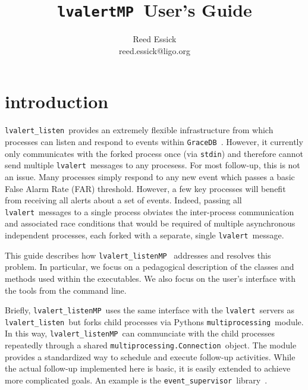 \documentclass{article}
\newcommand{\stdin}{\texttt{stdin}}
\newcommand{\multiprocessing}{\texttt{multiprocessing}}
\newcommand{\multiprocessingConnection}{\texttt{multiprocessing.Connection}}
\newcommand{\GraceDB}{\texttt{GraceDB}}
\newcommand{\alert}{\texttt{lvalert}}
\newcommand{\lvalertListen}{\texttt{lvalert\_listen}}
\newcommand{\lvalertMP}{\texttt{lvalertMP}}
\newcommand{\lvalertListenMP}{\texttt{lvalert\_listenMP}}
\newcommand{\eventSupervisor}{\texttt{event\_supervisor}}
\begin{document}

\title{
\lvalertMP~User's Guide
}

\author{
Reed Essick \\
reed.essick@ligo.org
}

\maketitle

\newpage


\tableofcontents
\listoffigures

\newpage


\section{introduction}

\lvalertListen~provides an extremely flexible infrastructure from which processes can listen and respond to events within \GraceDB~\cite{gracedb}. 
However, it currently only communicates with the forked process once (via \stdin) and therefore cannot send multiple \alert~messages to any procesess.
For most follow-up, this is not an issue.
Many processes simply respond to any new event which passes a basic False Alarm Rate (FAR) threshold. 
However, a few key processes will benefit from receiving all alerts about a set of events.
Indeed, passing all \alert~messages to a single process obviates the inter-process communication and associated race conditions that would be required of multiple asynchronous independent processes, each forked with a separate, single \alert~message.

This guide describes how \lvalertListenMP~\cite{lvalertMP} addresses and resolves this problem. 
In particular, we focus on a pedagogical description of the classes and methods used within the executables.
We also focus on the user's interface with the tools from the command line.

Briefly, \lvalertListenMP~uses the same interface with the \alert~servers as \lvalertListen~but forks child processes via Pythons \multiprocessing~module.
In this way, \lvalertListenMP~can communciate with the child processes repeatedly through a shared \multiprocessingConnection~object.
The module provides a standardized way to schedule and execute follow-up activities.
While the actual follow-up implemented here is basic, it is easily extended to achieve more complicated goals.
An example is the \eventSupervisor~library~\cite{eventSupervisor}.
\end{document}
